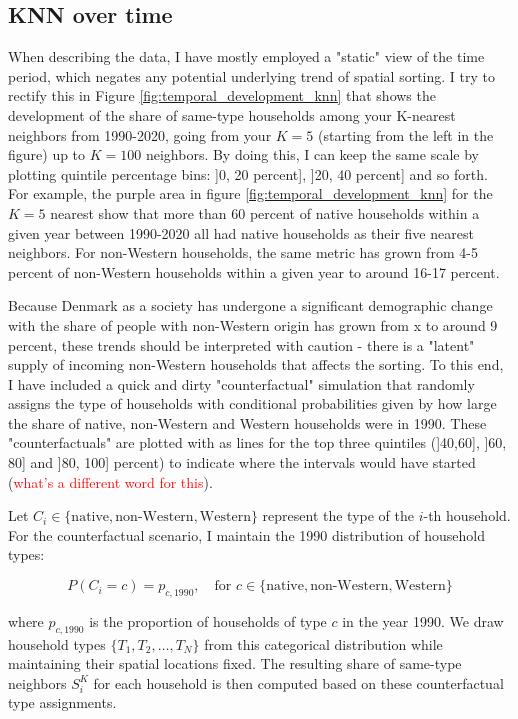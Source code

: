 \documentclass[main.tex]{subfiles}
\begin{document}
\subsection{KNN over time}
When describing the data, I have mostly employed a "static" view of the time period, which negates any potential underlying trend of spatial sorting. I try to rectify this in Figure \ref{fig:temporal_development_knn} that shows the development of the share of same-type households among your K-nearest neighbors from 1990-2020, going from your $K=5$ (starting from the left in the figure) up to $K=100$ neighbors. By doing this, I can keep the same scale by plotting quintile percentage bins: ]0, 20 percent], ]20, 40 percent] and so forth. For example, the purple area in figure \ref{fig:temporal_development_knn} for the $K=5$ nearest show that more than 60 percent of native households within a given year between 1990-2020 all had native households as their five nearest neighbors. For non-Western households, the same metric has grown from 4-5 percent of non-Western households within a given year to around 16-17 percent.

Because Denmark as a society has undergone a significant demographic change with the share of people with non-Western origin has grown from x to around 9 percent, these trends should be interpreted with caution - there is a "latent" supply of incoming non-Western households that affects the sorting. To this end, I have included a quick and dirty "counterfactual" simulation that randomly assigns the type of households with conditional probabilities given by how large the share of native, non-Western and Western households were in 1990. These "counterfactuals" are plotted with as lines for the top three quintiles (]40,60], ]60, 80] and ]80, 100] percent) to indicate where the intervals would have started (\textcolor{red}{what's a different word for this}).

Let $C_i \in \{\text{native}, \text{non-Western}, \text{Western}\}$ represent the type of the $i$-th household. For the counterfactual scenario, I maintain the 1990 distribution of household types:

$$P(C_i = c) = p_{c,1990}, \quad \text{for } c \in \{\text{native}, \text{non-Western}, \text{Western}\}$$

where $p_{c,1990}$ is the proportion of households of type $c$ in the year 1990. We draw household types $\{T_1, T_2, \ldots, T_N\}$ from this categorical distribution while maintaining their spatial locations fixed. The resulting share of same-type neighbors $S_i^K$ for each household is then computed based on these counterfactual type assignments.
\end{document}

